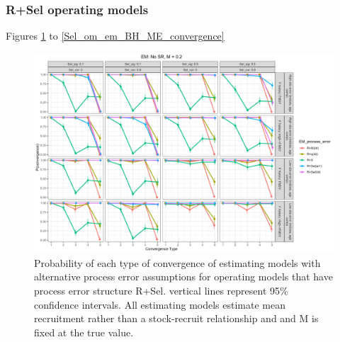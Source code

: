 \documentclass[
  12pt,
]{article}
\begin{document}
\hypertarget{rsel-operating-models}{%
\subsubsection*{R+Sel operating models}\label{rsel-operating-models}}

Figures \ref{Sel_om_em_R_MF_convergence} to
\ref{Sel_om_em_BH_ME_convergence}

\begin{landscape}
\begin{figure}
\caption{Probability of each type of convergence of estimating models with alternative process error assumptions for operating models that have process error structure R+Sel. vertical lines represent 95\% confidence intervals. All estimating models estimate mean recruitment rather than a stock-recruit relationship and and M is fixed at the true value.}\label{Sel_om_em_R_MF_convergence}
\begin{center}
\includegraphics[width = \textwidth]{Sel_om_p_convergence_meanR_M_fixed.png}
\end{center}
\end{figure}
\end{landscape}
\end{document}
